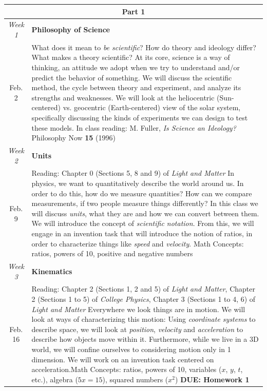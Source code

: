 \documentclass[12pt]{article}
\begin{document}
\noindent \begin{tabularx}{\textwidth}[c]{| c X |}
	\hline
	\multicolumn{2}{|c|}{\textbf{\large Part 1}} \\ \hline
	\textit{Week 1} & \textbf{Philosophy of Science} \\ Feb. 2 & What does it mean to \textit{be scientific}? How do theory and ideology differ? What makes a theory scientific? At its core, science is a way of thinking, an attitude we adopt when we try to understand and/or predict the behavior of something. We will discuss the scientific method, the cycle between theory and experiment, and analyze its strengths and weaknesses. We will look at the heliocentric (Sun-centered) vs. geocentric (Earth-centered) view of the solar system, specifically discussing the kinds of experiments we can design to test these models. 
	\newline In class reading: M. Fuller, \textit{Is Science an Ideology?} Philosophy Now \textbf{15} (1996)\\ \hline
	\textit{Week 2} & \textbf{Units} \\ Feb. 9 & Reading: Chapter 0 (Sections 5, 8 and 9) of \textit{Light and Matter} \newline In physics, we want to quantitatively describe the world around us. In order to do this, how do we measure quantities? How can we compare measurements, if two people measure things differently? In this class we will discuss \textit{units}, what they are and how we can convert between them. We will introduce the concept of \textit{scientific notation}. From this, we will engage in an invention task that will introduce the notion of ratios, in order to characterize things like \textit{speed} and \textit{velocity}. \newline Math Concepts: ratios, powers of 10, positive and negative numbers \\ \hline
	\textit{Week 3} & \textbf{Kinematics} \\ Feb. 16 & Reading: Chapter 2 (Sections 1, 2 and 5) of \textit{Light and Matter}, Chapter 2 (Sections 1 to 5) of \textit{College Physics}, Chapter 3 (Sections 1 to 4, 6) of \textit{Light and Matter} \newline Everywhere we look things are in motion. We will look at ways of characterizing this motion: Using \textit{coordinate systems} to describe space, we will look at \textit{position}, \textit{velocity} and \textit{acceleration} to describe how objects move within it. Furthermore, while we live in a 3D world, we will confine ourselves to considering motion only in 1 dimension. We will work on an invention task centered on acceleration.\newline Math Concepts: ratios, powers of 10, variables ($x$, $y$, $t$, etc.), algebra ($5x=15$), squared numbers ($x^2$) \newline \textbf{DUE: Homework 1}\\  \hline

\end{tabularx}
\end{document}
